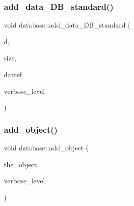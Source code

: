 \mbox{\label{classdatabase_a0f0ab218eb0f06da37f06906663db6eb}} 
\subsubsection{\texorpdfstring{add\+\_\+data\+\_\+\+D\+B\+\_\+standard()}{add\_data\_DB\_standard()}}
{\footnotesize\ttfamily void database\+::add\+\_\+data\+\_\+\+D\+B\+\_\+standard (\begin{DoxyParamCaption}\item[{void $\ast$}]{d,  }\item[{\mbox{\hyperlink{galois_8h_a09fddde158a3a20bd2dcadb609de11dc}{I\+NT}}}]{size,  }\item[{\mbox{\hyperlink{galois_8h_ac94af6544c710549c9fca744fd510395}{U\+I\+N\+T4}} $\ast$}]{datref,  }\item[{\mbox{\hyperlink{galois_8h_a09fddde158a3a20bd2dcadb609de11dc}{I\+NT}}}]{verbose\+\_\+level }\end{DoxyParamCaption})}

\mbox{\label{classdatabase_a880f60c1d94fff84d0db2b119361fbb6}} 
\subsubsection{\texorpdfstring{add\+\_\+object()}{add\_object()}}
{\footnotesize\ttfamily void database\+::add\+\_\+object (\begin{DoxyParamCaption}\item[{\mbox{\hyperlink{class_vector}{Vector}} \&}]{the\+\_\+object,  }\item[{\mbox{\hyperlink{galois_8h_a09fddde158a3a20bd2dcadb609de11dc}{I\+NT}}}]{verbose\+\_\+level }\end{DoxyParamCaption})}

\mbox{\label{classdatabase_a6b0c2e6ebb9938c57ce826647ed1ad40}} 
